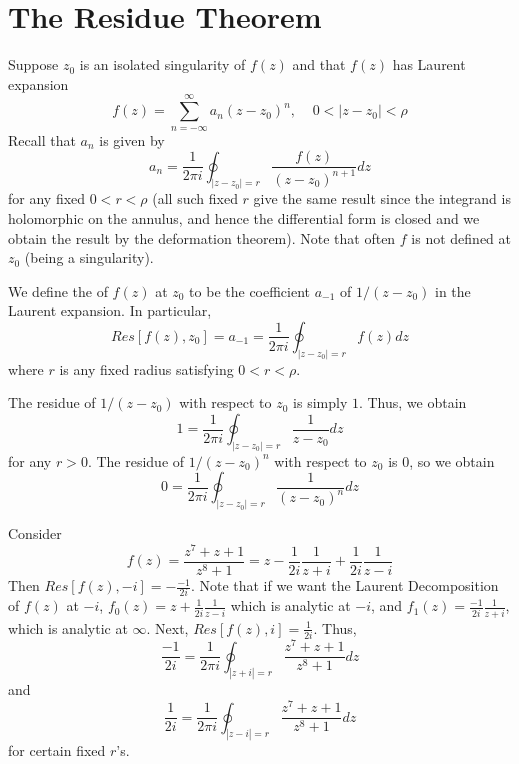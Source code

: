 \documentclass[12pt, a4paper, oneside, openright, titlepage]{book}
\begin{document}
\section{The Residue Theorem}



Suppose $z_0$ is an isolated singularity of $f(z)$ and that $f(z)$ has Laurent expansion \begin{equation*}
    f(z) = \sum_{n=-\infty}^{\infty}a_n(z-z_0)^n,\;\;\;\;0<|z-z_0|<\rho
\end{equation*}
Recall that $a_n$ is given by \begin{equation*}
    a_n = \frac{1}{2\pi i}\oint_{|z-z_0| = r}\frac{f(z)}{(z-z_0)^{n+1}}dz
\end{equation*}
for any fixed $0 < r <\rho$ (all such fixed $r$ give the same result since the integrand is holomorphic on the annulus, and hence the differential form is closed and we obtain the result by the deformation theorem). Note that often $f$ is not defined at $z_0$ (being a singularity).

\begin{defn}
    We define the  of $f(z)$ at $z_0$ to be the coefficient $a_{-1}$ of $1/(z-z_0)$ in the Laurent expansion. In particular, \begin{equation*}
        Res[f(z),z_0] = a_{-1} = \frac{1}{2\pi i}\oint_{|z-z_0|=r}f(z)dz
    \end{equation*}
    where $r$ is any fixed radius satisfying $0 < r < \rho$.
\end{defn}

\begin{eg}
    The residue of $1/(z-z_0)$ with respect to $z_0$ is simply $1$. Thus, we obtain \begin{equation*}
        1 = \frac{1}{2\pi i}\oint_{|z-z_0|=r}\frac{1}{z-z_0}dz
    \end{equation*}
    for any $r > 0$. The residue of $1/(z-z_0)^n$ with respect to $z_0$ is $0$, so we obtain \begin{equation*}
        0 = \frac{1}{2\pi i}\oint_{|z-z_0|=r}\frac{1}{(z-z_0)^n}dz
    \end{equation*}
\end{eg}


\begin{eg}
    Consider $$f(z) = \frac{z^7+z+1}{z^8+1} =z - \frac{1}{2i}\frac{1}{z+i}+\frac{1}{2i}\frac{1}{z-i}$$ Then $Res[f(z),-i] = -\frac{-1}{2i}$. Note that if we want the Laurent Decomposition of $f(z)$ at $-i$, $f_0(z) = z+\frac{1}{2i}\frac{1}{z-i}$ which is analytic at $-i$, and $f_1(z) = \frac{-1}{2i}\frac{1}{z+i}$, which is analytic at $\infty$. Next, $Res[f(z),i] = \frac{1}{2i}$. Thus, \begin{equation*}
        \frac{-1}{2i} = \frac{1}{2\pi i}\oint_{|z+i|=r}\frac{z^7+z+1}{z^8+1}dz 
    \end{equation*}
    and \begin{equation*}
        \frac{1}{2i} = \frac{1}{2\pi i}\oint_{|z-i|=r}\frac{z^7+z+1}{z^8+1}dz
    \end{equation*}
    for certain fixed $r$'s.
\end{eg}
\end{document}
